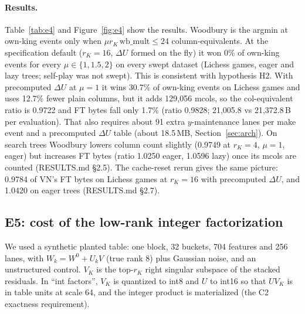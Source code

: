 \paragraph{Results.}
Table~\ref{tab:e4} and Figure~\ref{fig:e4} show the results.
Woodbury is the argmin at own-king events only when $\mu r_K\,\mathrm{wb\_mult}\le24$ column-equivalents.
At the specification default ($r_K=16$, $\Delta U$ formed on the fly) it won 0\% of own-king events for every $\mu\in\{1,1.5,2\}$ on every swept dataset (Lichess games, eager and lazy trees; self-play was not swept).
This is consistent with hypothesis H2.
With precomputed $\Delta U$ at $\mu=1$ it wins 30.7\% of own-king events on Lichess games and uses 12.7\% fewer plain columns, but it adds 129,056 mcols, so the col-equivalent ratio is 0.9722 and FT bytes fall only 1.7\% (ratio 0.9828; 21,005.8 vs 21,372.8\,B per evaluation).
That also requires about 91 extra $y$-maintenance lanes per make event and a precomputed $\Delta U$ table (about 18.5\,MB, Section~\ref{sec:arch}).
On search trees Woodbury lowers column count slightly (0.9749 at $r_K=4$, $\mu=1$, eager) but increases FT bytes (ratio 1.0250 eager, 1.0596 lazy) once its mcols are counted (RESULTS.md \S2.5).
The cache-reset rerun gives the same picture: 0.9784 of VN's FT bytes on Lichess games at $r_K=16$ with precomputed $\Delta U$, and 1.0420 on eager trees (RESULTS.md \S2.7).

\subsection{E5: cost of the low-rank integer factorization}\label{sec:e5}

We used a synthetic planted table: one block, 32 buckets, 704 features and 256 lanes, with $W_k=W^0+U_kV$ (true rank 8) plus Gaussian noise, and an unstructured control.
$V_K$ is the top-$r_K$ right singular subspace of the stacked residuals.
In ``int factors'', $V_K$ is quantized to int8 and $U$ to int16 so that $UV_K$ is in table units at scale 64, and the integer product is materialized (the C2 exactness requirement).

